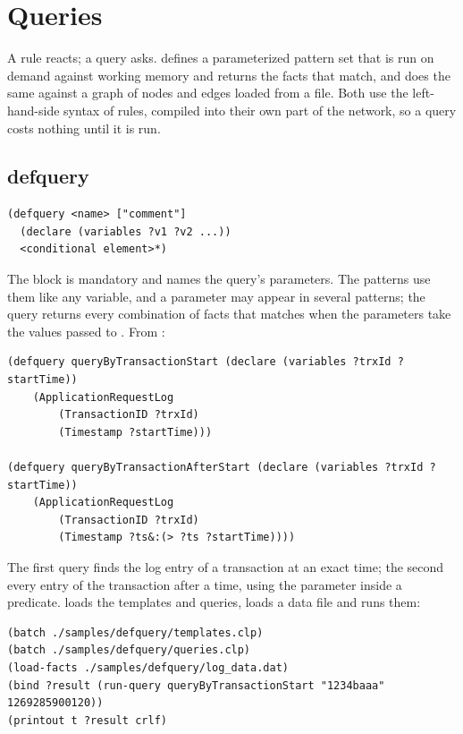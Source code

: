\chapter{Queries}
\label{ch:queries}

A rule reacts; a query asks.  defines a parameterized
pattern set that is run on demand against working memory and returns the
facts that match, and  does the same against a graph of
nodes and edges loaded from a file. Both use the left-hand-side syntax of
rules, compiled into their own part of the network, so a query costs
nothing until it is run.

\section{defquery}

\begin{lstlisting}
(defquery <name> ["comment"]
  (declare (variables ?v1 ?v2 ...))
  <conditional element>*)
\end{lstlisting}

The  block is mandatory and names the query's parameters.
The patterns use them like any variable, and a parameter may appear in
several patterns; the query returns every combination of facts that
matches when the parameters take the values passed to .
From :

\begin{lstlisting}
(defquery queryByTransactionStart (declare (variables ?trxId ?startTime))
    (ApplicationRequestLog
        (TransactionID ?trxId)
        (Timestamp ?startTime)))

(defquery queryByTransactionAfterStart (declare (variables ?trxId ?startTime))
    (ApplicationRequestLog
        (TransactionID ?trxId)
        (Timestamp ?ts&:(> ?ts ?startTime))))
\end{lstlisting}

The first query finds the log entry of a transaction at an exact time;
the second every entry of the transaction after a time, using the
parameter inside a predicate.  loads the
templates and queries, loads a data file and runs them:

\begin{lstlisting}
(batch ./samples/defquery/templates.clp)
(batch ./samples/defquery/queries.clp)
(load-facts ./samples/defquery/log_data.dat)
(bind ?result (run-query queryByTransactionStart "1234baaa" 1269285900120))
(printout t ?result crlf)
\end{lstlisting}

